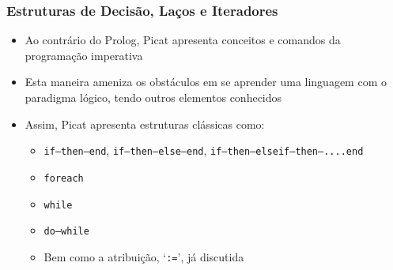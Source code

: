 \begin{frame}[fragile]
\frametitle{Estruturas de Decisão, Laços e Iteradores}
    
  
  \begin{itemize}
      
      \item Ao contrário do Prolog, Picat apresenta
      conceitos e comandos da programação imperativa
      
      \pause
      \item Esta maneira  ameniza os obstáculos
      em se aprender uma linguagem com o paradigma lógico,
      tendo outros elementos conhecidos
  
          \pause
      \item Assim, Picat apresenta estruturas clássicas
      como: 
      \begin{itemize}
        \item  \texttt{if--then--end}, \texttt{if--then--else--end}, \texttt{if--then--elseif--then--....end}
        \item  \texttt{foreach}
        \item  \texttt{while}
        \item  \texttt{do--while}
        \item Bem como a atribuição, `\texttt{:=}', já discutida
      \end{itemize}
   \end{itemize}

       
\end{frame}    
     
    
